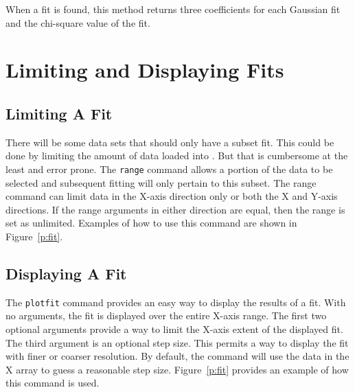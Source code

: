 When a fit is found, this method returns three coefficients for each
Gaussian fit and the chi-square value of the fit.

\section{Limiting and Displaying Fits}
\subsection*{Limiting A Fit}

There will be some data sets that should only have a subset fit.
This could be done by limiting the amount of data loaded into \wip.
But that is cumbersome at the least and error prone.
The {\tt range} command
allows a portion of the data to be selected and subsequent fitting
will only pertain to this subset.
The range command can limit data in the X-axis direction only
or both the X and Y-axis directions.
If the range arguments in either direction are equal, then the range is
set as unlimited.
Examples of how to use this command are shown in Figure~\ref{p:fit}.

\subsection*{Displaying A Fit}

The {\tt plotfit} command
provides an easy way to display the results of a fit.
With no arguments, the fit is displayed over the entire X-axis range.
The first two optional arguments provide a way to limit the X-axis
extent of the displayed fit.
The third argument is an optional step size.
This permits a way to display the fit with finer or coarser resolution.
By default, the command will use the data in the X array
to guess a reasonable step size.
Figure~\ref{p:fit} provides an example of how this command is used.
